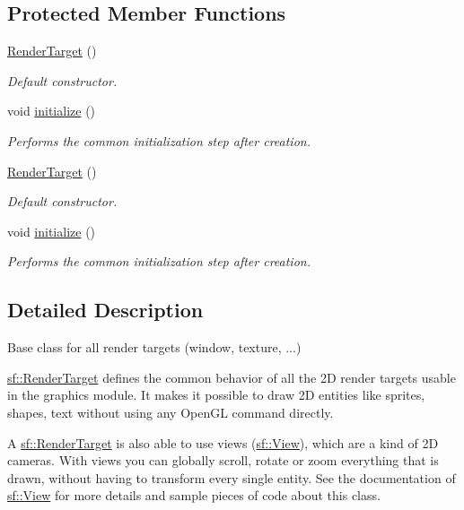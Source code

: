 \subsection*{Protected Member Functions}
\begin{DoxyCompactItemize}
\item 
\hyperlink{classsf_1_1_render_target_a2997c96cbd93cb8ce0aba2ddae35b86f}{Render\-Target} ()
\begin{DoxyCompactList}\small\item\em Default constructor. \end{DoxyCompactList}\item 
void \hyperlink{classsf_1_1_render_target_af530274b34159d644e509b4b4dc43eb7}{initialize} ()
\begin{DoxyCompactList}\small\item\em Performs the common initialization step after creation. \end{DoxyCompactList}\item 
\hyperlink{classsf_1_1_render_target_a2997c96cbd93cb8ce0aba2ddae35b86f}{Render\-Target} ()
\begin{DoxyCompactList}\small\item\em Default constructor. \end{DoxyCompactList}\item 
void \hyperlink{classsf_1_1_render_target_af530274b34159d644e509b4b4dc43eb7}{initialize} ()
\begin{DoxyCompactList}\small\item\em Performs the common initialization step after creation. \end{DoxyCompactList}\end{DoxyCompactItemize}


\subsection{Detailed Description}
Base class for all render targets (window, texture, ...) 

\hyperlink{classsf_1_1_render_target}{sf\-::\-Render\-Target} defines the common behavior of all the 2\-D render targets usable in the graphics module. It makes it possible to draw 2\-D entities like sprites, shapes, text without using any Open\-G\-L command directly.

A \hyperlink{classsf_1_1_render_target}{sf\-::\-Render\-Target} is also able to use views (\hyperlink{classsf_1_1_view}{sf\-::\-View}), which are a kind of 2\-D cameras. With views you can globally scroll, rotate or zoom everything that is drawn, without having to transform every single entity. See the documentation of \hyperlink{classsf_1_1_view}{sf\-::\-View} for more details and sample pieces of code about this class.

